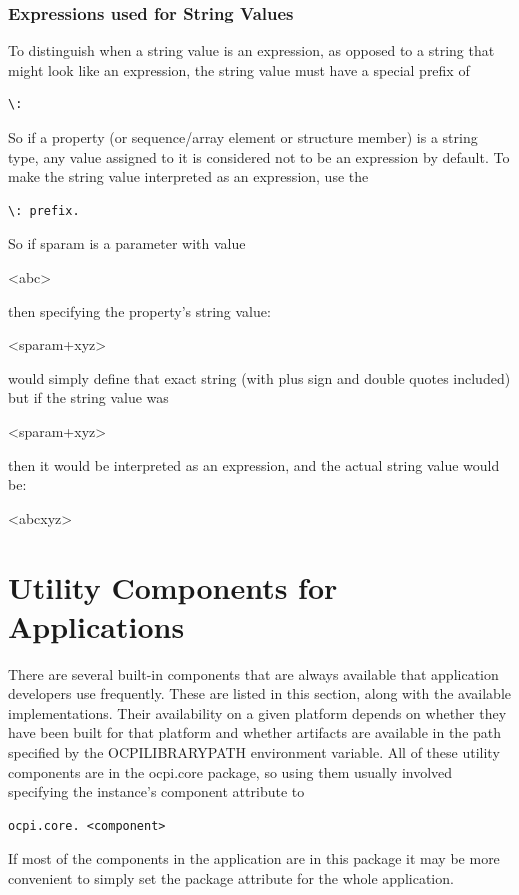 \documentclass[10pt, a4paper, oneside]{article}
\renewcommand\_{\textunderscore\allowbreak} %
\begin{document}
\subsubsection{Expressions used for String Values}To distinguish when a string value is an expression, as opposed to a string that might look like an expression, the string value must have a special prefix of \begin{verbatim}\: \end{verbatim}So if a property (or sequence/array element or structure member) is a string type, any value assigned to it is considered not to be an expression by default.  To make the string value interpreted as an expression, use the \begin{verbatim}\: prefix. \end{verbatim} So if sparam is a parameter with value \begin{ocpixml}
<abc>\end{ocpixml}
then specifying the property's string value:\begin{ocpixml}
<sparam+xyz>\end{ocpixml} 
would simply define that exact string (with plus sign and double quotes included) but if the string value was \begin{ocpixml}
<sparam+xyz>\end{ocpixml}
then it would be interpreted as an expression, and the actual string value would be:\begin{ocpixml}
<abcxyz>\end{ocpixml}
\section{Utility Components for Applications}\label{sec: utility components for applications}  There are several built-in components that are always available that application developers use frequently.  These are listed in this section, along with the available implementations.  Their availability on a given platform depends on whether they have been built for that platform and whether artifacts are available in the path specified by the OCPI\_LIBRARY\_PATH environment variable. All of these utility components are in the ocpi.core package, so using them usually involved specifying the instance's component attribute to \begin{verbatim}ocpi.core. <component>\end{verbatim} 
If most of the components in the application are in this package it may be more convenient to simply set the package attribute for the whole application.
\end{document}
